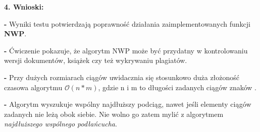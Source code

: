 \documentclass[12pt,a4paper,titlepage]{article}
\begin{document}
	
	
\begin{large}
	\textbf{4. Wnioski: \\}
	\newline
	\end{large}
\textbf{-} Wyniki testu potwierdzają poprawność działania zaimplementowanych funkcji \textbf{NWP}.
\begin{flushleft}
\textbf{-} Ćwiczenie pokazuje, że algorytm NWP może być przydatny w kontrolowaniu wersji dokumentów, książek czy też wykrywaniu plagiatów. \newline
 
\textbf{-} Przy dużych rozmiarach ciągów uwidacznia się stosunkowo duża złożoność czasowa algorytmu $\mathcal{O}(n*m)$, gdzie n i m to długości zadanych ciągów znaków .\newline
 
\textbf{-} Algorytm wyszukuje wspólny najdłuższy podciąg, nawet jeśli elementy ciągów zadanych nie leżą obok siebie. Nie wolno go zatem mylić z algorytmem \textit{ najdłuższego wspólnego podłańcucha}. \newline
 \end{flushleft} 
\end{document}
